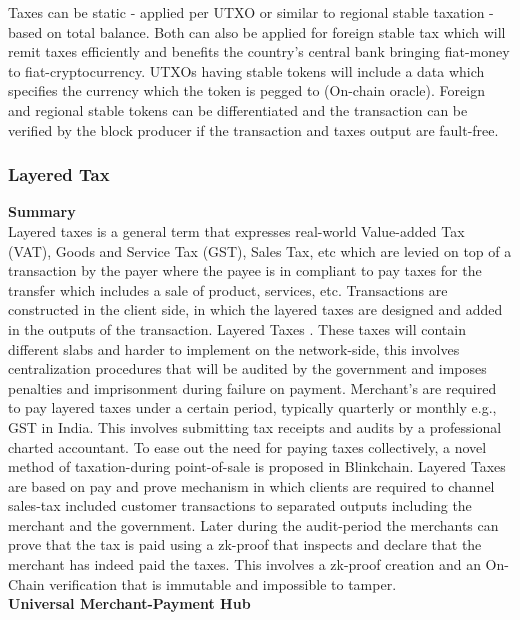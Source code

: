 \documentclass[letterpaper,11pt]{article}
\begin{document}
Taxes can be static - applied per UTXO or similar to regional stable taxation - based on total balance. Both can also be applied for foreign stable tax which will remit taxes efficiently and benefits the country's central bank bringing fiat-money to fiat-cryptocurrency. UTXOs having stable tokens will include a data which specifies the currency which the token is pegged to (On-chain oracle). Foreign and regional stable tokens can be differentiated and the transaction can be verified by the block producer if the transaction and taxes output are fault-free.\\

\subsubsection{Layered Tax}

\textbf{Summary}\\

Layered taxes is a general term that expresses real-world Value-added Tax (VAT), Goods and Service Tax (GST), Sales Tax, etc which are levied on top of a transaction by the payer where the payee is in compliant to pay taxes for the transfer which includes a sale of product, services, etc. Transactions are constructed in the client side, in which the layered taxes are designed and added in the outputs of the transaction. Layered Taxes . These taxes will contain different slabs and harder to implement on the network-side, this involves centralization  procedures that will be audited by the government and imposes penalties and imprisonment during failure on payment. Merchant's are required to pay layered taxes under a certain period, typically quarterly or monthly e.g., GST in India. This involves submitting tax receipts and audits by a professional charted accountant. To ease out the need for paying taxes collectively, a novel method of taxation-during point-of-sale is proposed in Blinkchain. Layered Taxes are based on pay and prove mechanism in which clients are required to channel sales-tax included customer transactions to separated outputs including the merchant and the government. Later during the audit-period the merchants can prove that the tax is paid using a zk-proof that inspects and declare that the merchant has indeed paid the taxes. This involves a zk-proof creation and an On-Chain verification that is immutable and impossible to tamper.\\

\textbf{Universal Merchant-Payment Hub}\\
\end{document}
